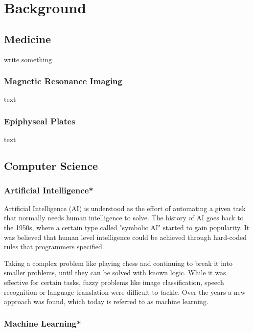 \section{Background}

\subsection{Medicine}

write something

\subsubsection{Magnetic Resonance Imaging}

text

\subsubsection{Epiphyseal Plates}

text

\subsection{Computer Science}

\subsubsection{Artificial Intelligence*}

Artificial Intelligence (AI) is understood as the effort of automating a given task that normally needs human intelligence to solve\cite{Chollet2017}. The history of AI goes back to the 1950s, where a certain type called "symbolic AI" started to gain popularity. It was believed that human level intelligence could be achieved through hard-coded rules that programmers specified. 

Taking a complex problem like playing chess and continuing to break it into smaller problems, until they can be solved with known logic. While it was effective for certain tasks, fuzzy problems like image classification, speech recognition or language translation were difficult to tackle. Over the years a new approach was found, which today is referred to as machine learning.

\subsubsection{Machine Learning*}

